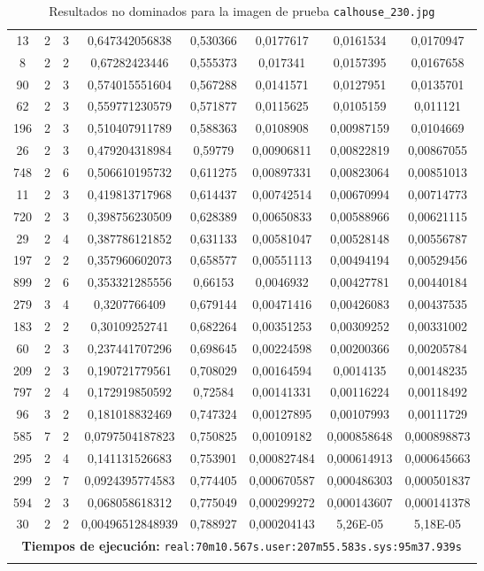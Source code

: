 \begin{longtable}{|c|c|c|c|c|c|c|c|}
13 & 2 & 3 & 0,647342056838 & 0,530366 & 0,0177617 & 0,0161534 & 0,0170947 \\
8 & 2 & 2 & 0,67282423446 & 0,555373 & 0,017341 & 0,0157395 & 0,0167658 \\
90 & 2 & 3 & 0,574015551604 & 0,567288 & 0,0141571 & 0,0127951 & 0,0135701 \\
62 & 2 & 3 & 0,559771230579 & 0,571877 & 0,0115625 & 0,0105159 & 0,011121 \\
196 & 2 & 3 & 0,510407911789 & 0,588363 & 0,0108908 & 0,00987159 & 0,0104669 \\
26 & 2 & 3 & 0,479204318984 & 0,59779 & 0,00906811 & 0,00822819 & 0,00867055 \\
748 & 2 & 6 & 0,506610195732 & 0,611275 & 0,00897331 & 0,00823064 & 0,00851013 \\
11 & 2 & 3 & 0,419813717968 & 0,614437 & 0,00742514 & 0,00670994 & 0,00714773 \\
720 & 2 & 3 & 0,398756230509 & 0,628389 & 0,00650833 & 0,00588966 & 0,00621115 \\
29 & 2 & 4 & 0,387786121852 & 0,631133 & 0,00581047 & 0,00528148 & 0,00556787 \\
197 & 2 & 2 & 0,357960602073 & 0,658577 & 0,00551113 & 0,00494194 & 0,00529456 \\
899 & 2 & 6 & 0,353321285556 & 0,66153 & 0,0046932 & 0,00427781 & 0,00440184 \\
279 & 3 & 4 & 0,3207766409 & 0,679144 & 0,00471416 & 0,00426083 & 0,00437535 \\
183 & 2 & 2 & 0,30109252741 & 0,682264 & 0,00351253 & 0,00309252 & 0,00331002 \\
60 & 2 & 3 & 0,237441707296 & 0,698645 & 0,00224598 & 0,00200366 & 0,00205784 \\
209 & 2 & 3 & 0,190721779561 & 0,708029 & 0,00164594 & 0,0014135 & 0,00148235 \\
797 & 2 & 4 & 0,172919850592 & 0,72584 & 0,00141331 & 0,00116224 & 0,00118492 \\
96 & 3 & 2 & 0,181018832469 & 0,747324 & 0,00127895 & 0,00107993 & 0,00111729 \\
585 & 7 & 2 & 0,0797504187823 & 0,750825 & 0,00109182 & 0,000858648 & 0,000898873 \\
295 & 2 & 4 & 0,141131526683 & 0,753901 & 0,000827484 & 0,000614913 & 0,000645663 \\
299 & 2 & 7 & 0,0924395774583 & 0,774405 & 0,000670587 & 0,000486303 & 0,000501837 \\
594 & 2 & 3 & 0,068058618312 & 0,775049 & 0,000299272 & 0,000143607 & 0,000141378 \\
30 & 2 & 2 & 0,00496512848939 & 0,788927 & 0,000204143 & 5,26E-05 & 5,18E-05 \\
\hline
\multicolumn{8}{|c|}{\textbf{Tiempos de ejecución:} \texttt{real:70m10.567s.user:207m55.583s.sys:95m37.939s}}\\  \hline
\caption{Resultados no dominados para la imagen de prueba \texttt{calhouse\_230.jpg}}
\label{tab:calhouse_230}
\end{longtable}
\normalsize


